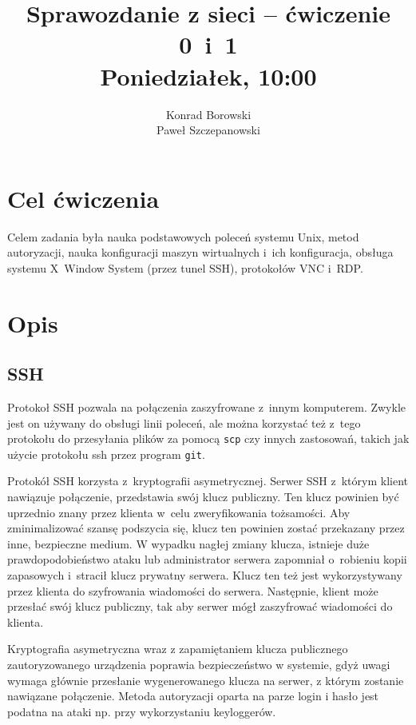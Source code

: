 \documentclass[a4paper,11pt]{article}
\title{Sprawozdanie z sieci -- ćwiczenie 0~i~1\\Poniedziałek, 10:00}
\author{Konrad Borowski\\Paweł Szczepanowski}
\begin{document}
\thispagestyle{empty}                   %

\maketitle

\section{Cel ćwiczenia}

Celem zadania była nauka podstawowych poleceń systemu Unix, metod autoryzacji, nauka
konfiguracji maszyn wirtualnych i~ich konfiguracja, obsługa systemu
X~Window System (przez tunel SSH), protokołów VNC i~RDP.

\section{Opis}

\subsection{SSH}

Protokoł SSH pozwala na połączenia zaszyfrowane z~innym komputerem. Zwykle
jest on używany do obsługi linii poleceń, ale można korzystać też z~tego
protokołu do przesyłania plików za pomocą \verb|scp| czy innych zastosowań,
takich jak użycie protokołu ssh przez program \verb|git|.

Protokół SSH korzysta z~kryptografii asymetrycznej.
Serwer SSH z~którym klient nawiązuje połączenie, przedstawia swój klucz publiczny. Ten
klucz powinien być uprzednio znany przez klienta w~celu zweryfikowania tożsamości. 
Aby zminimalizować szansę podszycia się, klucz ten powinien zostać przekazany
przez inne, bezpieczne medium.
W wypadku nagłej zmiany klucza, istnieje duże prawdopodobieństwo ataku lub
administrator serwera zapomniał o~robieniu kopii zapasowych i~stracił
klucz prywatny serwera. Klucz ten też jest wykorzystywany przez klienta
do szyfrowania wiadomości do serwera. Następnie, klient może przesłać swój
klucz publiczny, tak aby serwer mógł zaszyfrować wiadomości do klienta.

Kryptografia asymetryczna wraz z zapamiętaniem klucza publicznego zautoryzowanego 
urządzenia poprawia bezpieczeństwo w systemie, gdyż uwagi wymaga głównie przesłanie 
wygenerowanego klucza na serwer, z którym zostanie nawiązane połączenie. Metoda
autoryzacji oparta na parze login i hasło jest podatna na ataki np. przy wykorzystaniu
keyloggerów.
\end{document}
